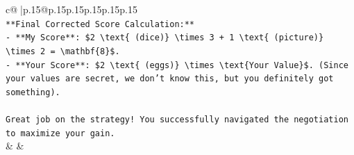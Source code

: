 \documentclass{article}
\begin{document}
{\begin{supertabular}{c@{$\;$}|p{.15\linewidth}@{}p{.15\linewidth}p{.15\linewidth}p{.15\linewidth}p{.15\linewidth}p{.15\linewidth}}
{{{\\ 
\texttt{**Final Corrected Score Calculation:**} \\
\texttt{{-} **My Score**: \$2 \textbackslash{}text\{ (dice)\} \textbackslash{}times 3 + 1 \textbackslash{}text\{ (picture)\} \textbackslash{}times 2 = \textbackslash{}mathbf\{8\}\$.} \\
\texttt{{-} **Your Score**: \$2 \textbackslash{}text\{ (eggs)\} \textbackslash{}times \textbackslash{}text\{Your Value\}\$. (Since your values are secret, we don't know this, but you definitely got something).} \\
\\ 
\texttt{Great job on the strategy! You successfully navigated the negotiation to maximize your gain.} \\
            }
        }
    }
    & & \\ \\


\end{supertabular}}
\end{document}
